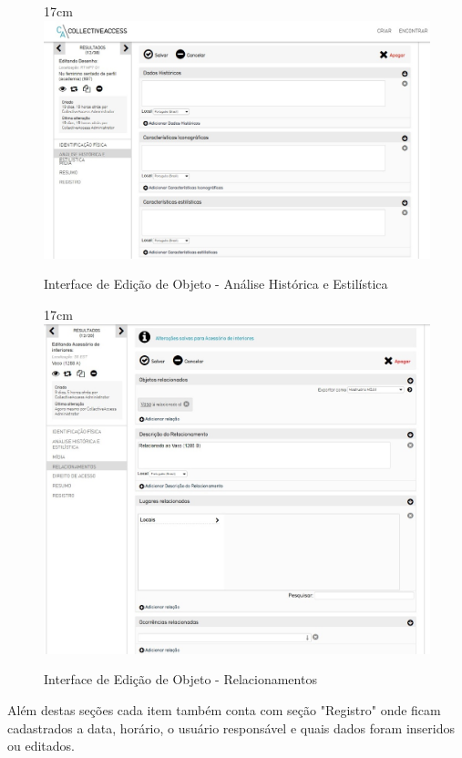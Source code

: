 \documentclass[a4paper,12pt,oneside,onecolumn,final,fleqn]{repUERJ}
\begin{document}
\begin{figure}[!ht]{17cm}
	\includegraphics[width=15cm, center]{figuras/Tela_hist.jpg}
	\caption{Interface de Edição de Objeto - Análise Histórica e Estilística} \label{fig:Tela_hist}
\end{figure}

\begin{figure}[!ht]{17cm}
	\includegraphics[width=15cm, center]{figuras/Tela_Relac.jpg}
	\caption{Interface de Edição de Objeto - Relacionamentos} \label{fig:Tela_rel}
\end{figure}

Além destas seções cada item também conta com seção "Registro" onde ficam cadastrados a data, horário, o usuário responsável e quais dados foram inseridos ou editados.
\end{document}
